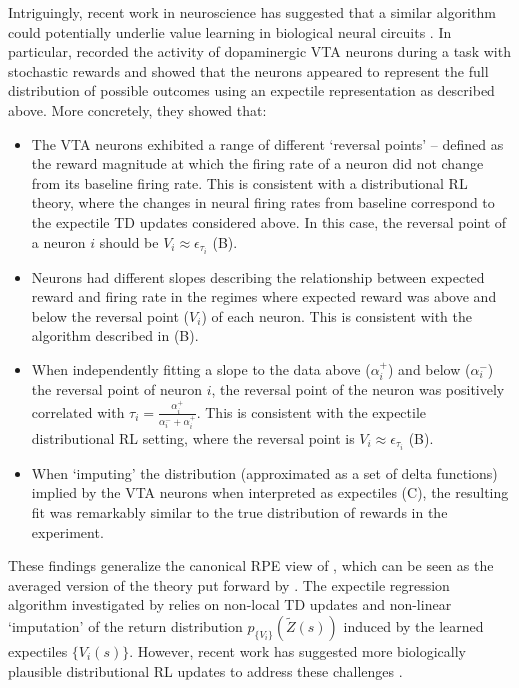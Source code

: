 Intriguingly, recent work in neuroscience has suggested that a similar algorithm could potentially underlie value learning in biological neural circuits \citep{dabney2020distributional,lowet2020distributional}.
In particular, \citet{dabney2020distributional} recorded the activity of dopaminergic VTA neurons during a task with stochastic rewards and showed that the neurons appeared to represent the full distribution of possible outcomes using an expectile representation as described above.
More concretely, they showed that:
\begin{itemize}
    \item The VTA neurons exhibited a range of different `reversal points' -- defined as the reward magnitude at which the firing rate of a neuron did not change from its baseline firing rate.
    This is consistent with a distributional RL theory, where the changes in neural firing rates from baseline correspond to the expectile TD updates considered above.
    In this case, the reversal point of a neuron $i$ should be $V_i \approx \epsilon_{\tau_i}$ (B).
    \item Neurons had different slopes describing the relationship between expected reward and firing rate in the regimes where expected reward was above and below the reversal point ($V_i$) of each neuron.
    This is consistent with the algorithm described in  (B).
    \item When independently fitting a slope to the data above ($\alpha_i^+$) and below ($\alpha_i^-$) the reversal point of neuron $i$, the reversal point of the neuron was positively correlated with $\tau_i = \frac{\alpha_i^{+}}{\alpha_i^- + \alpha_i^+}$.
    This is consistent with the expectile distributional RL setting, where the reversal point is $V_i \approx \epsilon_{\tau_i}$ (B).
    \item When `imputing' the distribution (approximated as a set of delta functions) implied by the VTA neurons when interpreted as expectiles (C), the resulting fit was remarkably similar to the true distribution of rewards in the experiment.
\end{itemize}
These findings generalize the canonical RPE view of \citet{schultz1997neural}, which can be seen as the averaged version of the theory put forward by \citet{dabney2020distributional}.
The expectile regression algorithm investigated by \citet{dabney2020distributional} relies on non-local TD updates and non-linear `imputation' of the return distribution $p_{\{ V_i \} }(\tilde{Z}(s))$ induced by the learned expectiles $\{ V_i(s) \}$. 
However, recent work has suggested more biologically plausible distributional RL updates to address these challenges \citep{tano2020local,wenliang2023distributional}.
